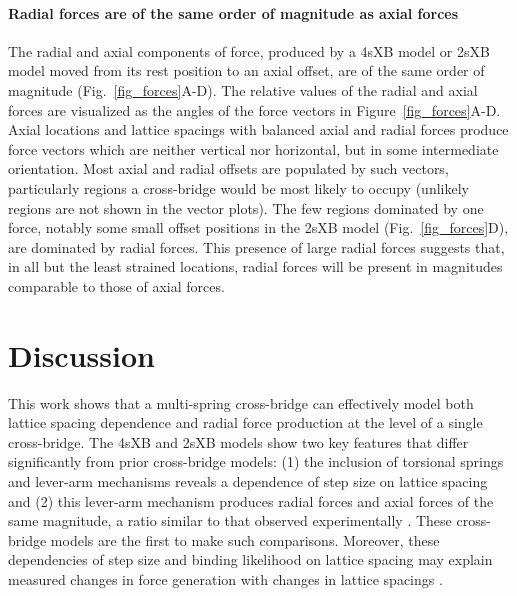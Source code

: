 \documentclass[]{article}
\begin{document}
\paragraph{Radial forces are of the same order of magnitude as axial forces} %
The radial and axial components of force, produced by a 4sXB model or 2sXB model moved from its rest position to an axial offset, are of the same order of magnitude (Fig.~\ref{fig_forces}A-D). 
The relative values of the radial and axial forces are visualized as the angles of the force vectors in Figure~\ref{fig_forces}A-D. 
Axial locations and lattice spacings with balanced axial and radial forces produce force vectors which are neither vertical nor horizontal, but in some intermediate orientation.
Most axial and radial offsets are populated by such vectors, particularly regions a cross-bridge would be most likely to occupy (unlikely regions are not shown in the vector plots). 
The few regions dominated by one force, notably some small offset positions in the 2sXB model (Fig.~\ref{fig_forces}D), are dominated by radial forces.
This presence of large radial forces suggests that, in all but the least strained locations, radial forces will be present in magnitudes comparable to those of axial forces. 



\section*{Discussion} %

This work shows that a multi-spring cross-bridge can effectively model both lattice spacing dependence and radial force production at the level of a single cross-bridge. 
The 4sXB and 2sXB models show two key features that differ significantly from prior cross-bridge models: (1) the inclusion of torsional springs and lever-arm mechanisms reveals a dependence of step size on lattice spacing and (2) this lever-arm mechanism produces radial forces and axial forces of the same magnitude, a ratio similar to that observed experimentally \citep{Cecchi1990, Brenner1991}. 
These cross-bridge models are the first to make such comparisons.
Moreover, these dependencies of step size and binding likelihood on lattice spacing may explain measured changes in force generation with changes in lattice spacings  \citep{Millman1998}. 
\end{document}
